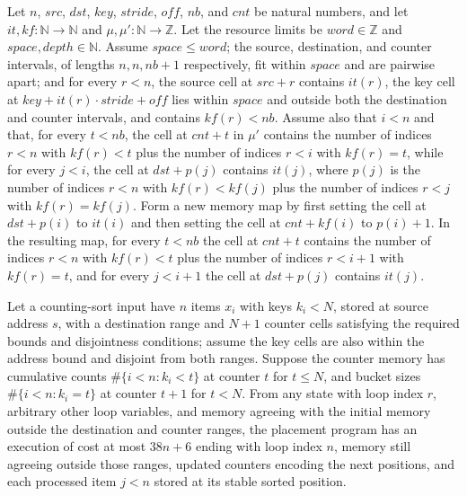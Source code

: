 \begin{theorem}
\label{Light.CsPlaced.succ}
\leanok
{}
Let $n$, $src$, $dst$, $key$, $stride$, $off$, $nb$, and $cnt$ be natural numbers, and
let $it,kf:\mathbb{N}\to\mathbb{N}$ and $\mu,\mu':\mathbb{N}\to\mathbb{Z}$. Let the
resource limits be $word\in\mathbb{Z}$ and $space,depth\in\mathbb{N}$. Assume $space\le
word$; the source, destination, and counter intervals, of lengths $n,n,nb+1$
respectively, fit within $space$ and are pairwise apart; and for every $r<n$, the source
cell at $src+r$ contains $it(r)$, the key cell at $key+it(r)\cdot stride+off$ lies
within $space$ and outside both the destination and counter intervals, and contains
$kf(r)<nb$. Assume also that $i<n$ and that, for every $t<nb$, the cell at $cnt+t$ in
$\mu'$ contains the number of indices $r<n$ with $kf(r)<t$ plus the number of indices
$r<i$ with $kf(r)=t$, while for every $j<i$, the cell at $dst+p(j)$ contains $it(j)$,
where $p(j)$ is the number of indices $r<n$ with $kf(r)<kf(j)$ plus the number of
indices $r<j$ with $kf(r)=kf(j)$. Form a new memory map by first setting the cell at
$dst+p(i)$ to $it(i)$ and then setting the cell at $cnt+kf(i)$ to $p(i)+1$. In the
resulting map, for every $t<nb$ the cell at $cnt+t$ contains the number of indices $r<n$
with $kf(r)<t$ plus the number of indices $r<i+1$ with $kf(r)=t$, and for every $j<i+1$
the cell at $dst+p(j)$ contains $it(j)$.
\end{theorem}

\begin{theorem}
\label{Light.csPlace_ends}
\leanok
{}
Let a counting-sort input have $n$ items $x_i$ with keys $k_i<N$, stored at source
address $s$, with a destination range and $N+1$ counter cells satisfying the required
bounds and disjointness conditions; assume the key cells are also within the address
bound and disjoint from both ranges. Suppose the counter memory has cumulative counts
$\#\{i<n:k_i<t\}$ at counter $t$ for $t\le N$, and bucket sizes $\#\{i<n:k_i=t\}$ at
counter $t+1$ for $t<N$. From any state with loop index $r$, arbitrary other loop
variables, and memory agreeing with the initial memory outside the destination and
counter ranges, the placement program has an execution of cost at most $38n+6$ ending
with loop index $n$, memory still agreeing outside those ranges, updated counters
encoding the next positions, and each processed item $j<n$ stored at its stable sorted
position.
\end{theorem}

